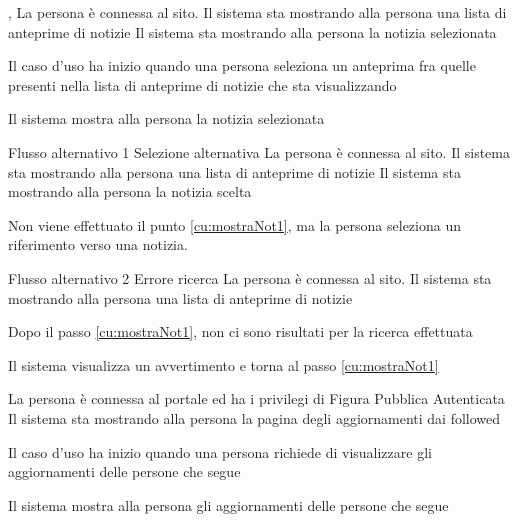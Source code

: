 
{, }
{La persona è connessa al sito. Il sistema sta mostrando alla persona una lista di anteprime di notizie}
{Il sistema sta mostrando alla persona la notizia selezionata}
{\begin{enumCU}
	\item Il caso d'uso ha inizio quando una persona seleziona un anteprima fra quelle presenti nella lista di anteprime di notizie che sta visualizzando\label{cu:mostraNot1}
	\item Il sistema mostra alla persona la notizia selezionata
	\item {}
\end{enumCU}
}
%
{Flusso alternativo 1}%
{Selezione alternativa}%
{La persona è connessa al sito. Il sistema sta mostrando alla persona una lista di anteprime di notizie}%
{Il sistema sta mostrando alla persona la notizia scelta}%
{\begin{enumCU}
		\item Non viene effettuato il punto \ref{cu:mostraNot1}, ma la persona seleziona un \gls{riferimento} verso una notizia.
\end{enumCU}}%
%
{Flusso alternativo 2}%
{Errore ricerca}%
{La persona è connessa al sito. Il sistema sta mostrando alla persona una lista di anteprime di notizie}%
{\postNulle}%
{\begin{enumCU}
		\item Dopo il passo \ref{cu:mostraNot1}, non ci sono risultati per la ricerca effettuata
		\item Il sistema visualizza un avvertimento e torna al passo \ref{cu:mostraNot1}
\end{enumCU}}%


{}
{La persona è connessa al portale ed ha i privilegi di Figura Pubblica Autenticata}
{Il sistema sta mostrando alla persona la pagina degli aggiornamenti dai followed}
{\begin{enumCU}
	\item Il caso d'uso ha inizio quando una persona richiede di visualizzare gli aggiornamenti delle persone che segue
	\item Il sistema mostra alla persona gli aggiornamenti delle persone che segue
\end{enumCU}}

